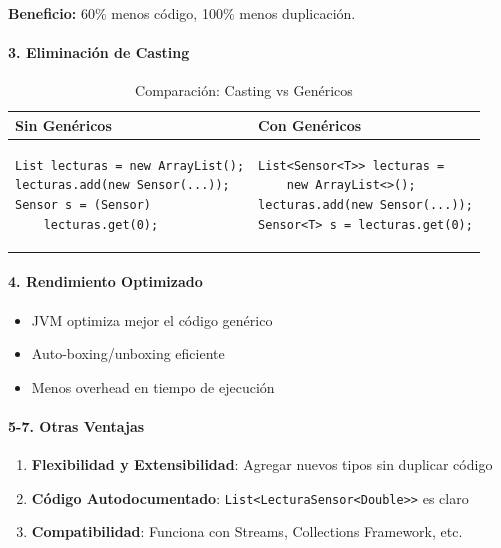 \documentclass[12pt,a4paper]{article}
\begin{document}
\textbf{Beneficio:} 60\% menos código, 100\% menos duplicación.

\paragraph{3. Eliminación de Casting}

\begin{table}[h]
\centering
\begin{tabular}{|p{6cm}|p{6cm}|}
\hline
\rowcolor{agrogreen!20}
\textbf{Sin Genéricos} & \textbf{Con Genéricos} \\
\hline
\begin{lstlisting}[basicstyle=\ttfamily\tiny]
List lecturas = new ArrayList();
lecturas.add(new Sensor(...));
Sensor s = (Sensor) 
    lecturas.get(0);
\end{lstlisting}
&
\begin{lstlisting}[basicstyle=\ttfamily\tiny]
List<Sensor<T>> lecturas = 
    new ArrayList<>();
lecturas.add(new Sensor(...));
Sensor<T> s = lecturas.get(0);
\end{lstlisting}
\\
\hline
\end{tabular}
\caption{Comparación: Casting vs Genéricos}
\end{table}

\paragraph{4. Rendimiento Optimizado}

\begin{itemize}
    \item JVM optimiza mejor el código genérico
    \item Auto-boxing/unboxing eficiente
    \item Menos overhead en tiempo de ejecución
\end{itemize}

\paragraph{5-7. Otras Ventajas}

\begin{enumerate}[start=5]
    \item \textbf{Flexibilidad y Extensibilidad}: Agregar nuevos tipos sin duplicar código
    \item \textbf{Código Autodocumentado}: \texttt{List<LecturaSensor<Double>>} es claro
    \item \textbf{Compatibilidad}: Funciona con Streams, Collections Framework, etc.
\end{enumerate}
\end{document}
